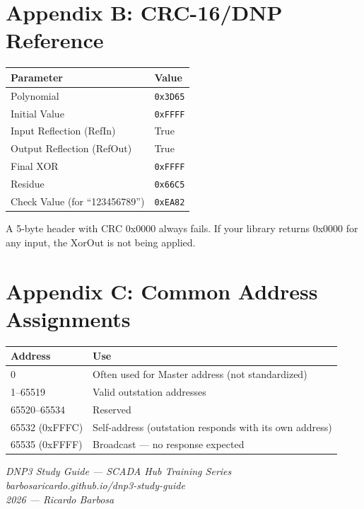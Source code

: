 \documentclass[11pt,twoside]{article}
\begin{document}
\section*{Appendix B: CRC-16/DNP Reference}

\begin{tabularx}{\textwidth}{lX}
\toprule
\textbf{Parameter} & \textbf{Value} \\
\midrule
Polynomial & \texttt{0x3D65} \\
Initial Value & \texttt{0xFFFF} \\
Input Reflection (RefIn) & True \\
Output Reflection (RefOut) & True \\
Final XOR & \texttt{0xFFFF} \\
Residue & \texttt{0x66C5} \\
Check Value (for ``123456789'') & \texttt{0xEA82} \\
\bottomrule
\end{tabularx}

A 5-byte header with CRC 0x0000 always fails. If your library returns 0x0000 for any input, the XorOut is not being applied.

\section*{Appendix C: Common Address Assignments}

\begin{tabularx}{\textwidth}{lX}
\toprule
\textbf{Address} & \textbf{Use} \\
\midrule
0 & Often used for Master address (not standardized) \\
1--65519 & Valid outstation addresses \\
65520--65534 & Reserved \\
65532 (0xFFFC) & Self-address (outstation responds with its own address) \\
65535 (0xFFFF) & Broadcast --- no response expected \\
\bottomrule
\end{tabularx}

\bigskip
\begin{center}
\small
\textit{DNP3 Study Guide --- SCADA Hub Training Series}\\
\textit{barbosaricardo.github.io/dnp3-study-guide}\\
\textit{2026 --- Ricardo Barbosa}
\end{center}
\end{document}
